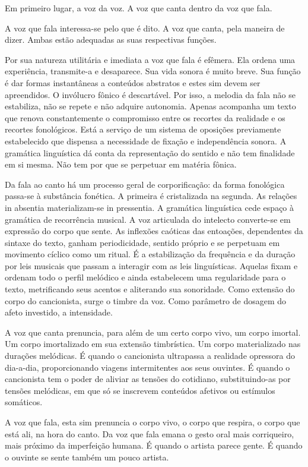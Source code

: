 Em primeiro lugar, a voz da voz. A voz que canta dentro da voz que fala.

A voz que fala interessa-se pelo que é dito. A voz que canta, pela
maneira de dizer. Ambas estão adequadas as suas respectivas funções.

Por sua natureza utilitária e imediata a voz que fala é efêmera. Ela
ordena uma experiência, transmite-a e desaparece. Sua vida sonora é
muito breve. Sua função é dar formas instantâneas a conteúdos abstratos
e estes sim devem ser apreendidos. O invólucro fônico é descartável. Por
isso, a melodia da fala não se estabiliza, não se repete e não adquire
autonomia. Apenas acompanha um texto que renova constantemente o
compromisso entre os recortes da realidade e os recortes fonológicos.
Está a serviço de um sistema de oposições previamente estabelecido que
dispensa a necessidade de fixação e independência sonora. A gramática
linguística dá conta da representação do sentido e não tem finalidade em
si mesma. Não tem por que se perpetuar em matéria fônica.

Da fala ao canto há um processo geral de corporificação: da forma
fonológica passa-se à substância fonética. A primeira é cristalizada na
segunda. As relações in absentia materializam-se in pressentia. A
gramática linguística cede espaço à gramática de recorrência musical. A
voz articulada do intelecto converte-se em expressão do corpo que sente.
As inflexões caóticas das entoações, dependentes da sintaxe do texto,
ganham periodicidade, sentido próprio e se perpetuam em movimento
cíclico como um ritual. É a estabilização da frequência e da duração por
leis musicais que passam a interagir com as leis linguísticas. Aquelas
fixam e ordenam todo o perfil melódico e ainda estabelecem uma
regularidade para o texto, metrificando seus acentos e aliterando sua
sonoridade. Como extensão do corpo do cancionista, surge o timbre da
voz. Como parâmetro de dosagem do afeto investido, a intensidade.

A voz que canta prenuncia, para além de um certo corpo vivo, um corpo
imortal. Um corpo imortalizado em sua extensão timbrística. Um corpo
materializado nas durações melódicas. É quando o cancionista ultrapassa
a realidade opressora do dia-a-dia, proporcionando viagens intermitentes
aos seus ouvintes. É quando o cancionista tem o poder de aliviar as
tensões do cotidiano, substituindo-as por tensões melódicas, em que só
se inscrevem conteúdos afetivos ou estímulos somáticos.

A voz que fala, esta sim prenuncia o corpo vivo, o corpo que respira, o
corpo que está ali, na hora do canto. Da voz que fala emana o gesto oral
mais corriqueiro, mais próximo da imperfeição humana. É quando o artista
parece gente. É quando o ouvinte se sente também um pouco artista.

